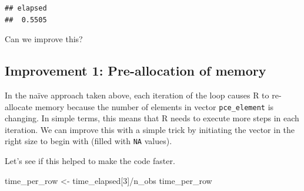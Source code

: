 \documentclass[
  12pt,
]{style/krantz}
\newenvironment{Shaded}{\begin{snugshade}}{\end{snugshade}}
\newcommand{\CommentTok}[1]{\textcolor[rgb]{0.56,0.35,0.01}{\textit{#1}}}
\newcommand{\ConstantTok}[1]{\textcolor[rgb]{0.00,0.00,0.00}{#1}}
\newcommand{\ControlFlowTok}[1]{\textcolor[rgb]{0.13,0.29,0.53}{\textbf{#1}}}
\newcommand{\DecValTok}[1]{\textcolor[rgb]{0.00,0.00,0.81}{#1}}
\newcommand{\FloatTok}[1]{\textcolor[rgb]{0.00,0.00,0.81}{#1}}
\newcommand{\FunctionTok}[1]{\textcolor[rgb]{0.00,0.00,0.00}{#1}}
\newcommand{\NormalTok}[1]{#1}
\newcommand{\OtherTok}[1]{\textcolor[rgb]{0.56,0.35,0.01}{#1}}
\newcommand{\SpecialCharTok}[1]{\textcolor[rgb]{0.00,0.00,0.00}{#1}}
\begin{document}
\begin{verbatim}
## elapsed 
##  0.5505
\end{verbatim}

Can we improve this?

\hypertarget{improvement-1-pre-allocation-of-memory}{%
\subsection{Improvement 1: Pre-allocation of memory}\label{improvement-1-pre-allocation-of-memory}}

In the naïve approach taken above, each iteration of the loop causes R to re-allocate memory because the number of elements in vector \texttt{pce\_element} is changing. In simple terms, this means that R needs to execute more steps in each iteration. We can improve this with a simple trick by initiating the vector in the right size to begin with (filled with \texttt{NA} values).

\begin{Shaded}
\end{Shaded}

Let's see if this helped to make the code faster.

\begin{Shaded}
\begin{Highlighting}[]
\NormalTok{time\_per\_row }\OtherTok{\textless{}{-}}\NormalTok{ time\_elapsed[}\DecValTok{3}\NormalTok{]}\SpecialCharTok{/}\NormalTok{n\_obs}
\NormalTok{time\_per\_row}
\end{Highlighting}
\end{Shaded}
\end{document}
